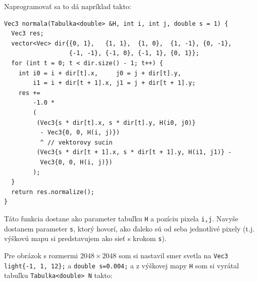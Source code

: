 \documentclass[10pt]{article}
\def\set#1#2{\pgfmathsetmacro{#1}{#2}}
\def\len#1#2#3#4{\set{#1}{sqrt(((#2)*(#2))+((#3)*(#3))+((#4)*(#4)))}}
\def\normalize#1#2#3{
  \len{\tmp}{#1}{#2}{#3}
  \set{#1}{#1/\tmp}
  \set{#2}{#2/\tmp}
  \set{#3}{#3/\tmp}
}
\def\cross#1#2#3#4#5#6#7#8#9{%
  \set{#1}{#5*#9-#6*#8}
  \set{#2}{#6*#7-#4*#9}
  \set{#3}{#4*#8-#5*#7}
}
\def\prg{\lstinline}
\def\ods{\vspace*{10pt}}
\begin{document}
{{}

\ods
Naprogramovať sa to dá napríklad takto:

\ods
\begin{lstlisting}
Vec3 normala(Tabulka<double> &H, int i, int j, double s = 1) {
  Vec3 res;
  vector<Vec> dir{{0, 1},   {1, 1},  {1, 0},  {1, -1}, {0, -1},
                  {-1, -1}, {-1, 0}, {-1, 1}, {0, 1}};
  for (int t = 0; t < dir.size() - 1; t++) {
    int i0 = i + dir[t].x,     j0 = j + dir[t].y, 
        i1 = i + dir[t + 1].x, j1 = j + dir[t + 1].y;
    res +=
        -1.0 *
        (
         (Vec3{s * dir[t].x, s * dir[t].y, H(i0, j0)} 
          - Vec3{0, 0, H(i, j)}) 
          ^ // vektorovy sucin
         (Vec3{s * dir[t + 1].x, s * dir[t + 1].y, H(i1, j1)} -
          Vec3{0, 0, H(i, j)})
        );
  }
  return res.normalize();
}
\end{lstlisting}

\ods
Táto funkcia dostane ako parameter tabuľku {\tt H} a pozíciu pixela {\tt i,j}.
Navyše dostanem parameter {\tt s}, ktorý hovorí, ako ďaleko sú od seba jednotlivé pixely
(t.j. výškovú mapu si predstavujem ako sieť s krokom {\tt s}).

\ods
Pre obrázok s rozmermi $2048\times2048$ som si nastavil smer svetla na 
\prg!Vec3 light{-1, 1, 12};! a \prg!double s=0.004;! a 
z výškovej mapy {\tt H} som si vyrátal tabuľku \prg!Tabulka<double> N!
takto:

}
\end{document}
